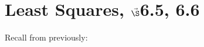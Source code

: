 


%

%


\section{{Least Squares, $\vec\S$6.5, 6.6}}%
% 

%
\thispagestyle{fancy}

Recall from previously:

